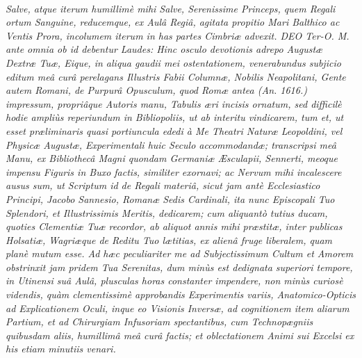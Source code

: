 \documentclass[a4paper, 11pt, oneside, polutonikogreek, german]{article}
\begin{document}
\paragraph{}
\emph{Salve, atque iterum humillimè mihi Salve, Serenissime Princeps, quem Regali ortum Sanguine, reducemque, ex Aulâ Regiâ, agitata propitio Mari Balthico ac Ventis Prora, incolumem iterum in has partes Cimbriæ advexit. DEO Ter-O. M. ante omnia ob id debentur Laudes: Hinc osculo devotionis adrepo Augustæ Dextræ Tuæ, Eique, in aliqua gaudii mei ostentationem, venerabundus subjicio editum meâ curâ perelagans Illustris Fabii Columnæ, Nobilis Neapolitani, Gente autem Romani, de Purpurâ Opusculum, quod Romæ antea (An. 1616.) impressum, propriâque Autoris manu, Tabulis æri incisis ornatum, sed difficilè hodie ampliùs reperiundum in Bibliopoliis, ut ab interitu vindicarem, tum et, ut esset præliminaris quasi portiuncula ededi à Me Theatri Naturæ Leopoldini, vel Physicæ Augustæ, Experimentali huic Seculo accommodandæ; transcripsi meâ Manu, ex Bibliothecâ Magni quondam Germaniæ Æsculapii, Sennerti, meoque impensu Figuris in Buxo factis, similiter exornavi; ac Nervum mihi incalescere ausus sum, ut Scriptum id de Regali materiâ, sicut jam antè Ecclesiastico Principi, Jacobo Sannesio, Romanæ Sedis Cardinali, ita nunc Episcopali Tuo Splendori, et Illustrissimis Meritis, dedicarem; cum aliquantò tutius ducam, quoties Clementiæ Tuæ recordor, ab aliquot annis mihi præstitæ, inter publicas Holsatiæ, Wagriæque de Reditu Tuo lætitias, ex alienâ fruge liberalem, quam planè mutum esse. Ad hæc peculiariter me ad Subjectissimum Cultum et Amorem obstrinxit jam pridem Tua Serenitas, dum minùs est dedignata superiori tempore, in Utinensi suâ Aulâ, plusculas horas constanter impendere, non minùs curiosè videndis, quàm clementissimè approbandis Experimentis variis, Anatomico-Opticis ad Explicationem Oculi, inque eo Visionis Inversæ, ad cognitionem item aliarum Partium, et ad Chirurgiam Infusoriam spectantibus, cum Technopægniis quibusdam aliis, humillimâ meâ curâ factis; et oblectationem Animi sui Excelsi ex his etiam minutiis venari.}
\end{document}
